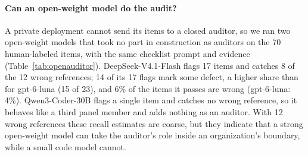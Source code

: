 \begin{table}[H]
\centering
\footnotesize
\setlength{\tabcolsep}{2.5pt}
\caption{The seven sampled references judged wrong on a clear question, the fix applied to each, whether the corrected query returns different rows on the current graph, and how many of the 11 models are scored right against the released and the corrected reference (zero-shot, projected EX).}
\label{tab:corrected}
\end{table}

\paragraph{Can an open-weight model do the audit?} A private deployment cannot send its items to a closed auditor, so we ran two open-weight models that took no part in construction as auditors on the 70 human-labeled items, with the same checklist prompt and evidence (Table~\ref{tab:openauditor}). DeepSeek-V4.1-Flash flags 17 items and catches 8 of the 12 wrong references; 14 of its 17 flags mark some defect, a higher share than for gpt-6-luna (15 of 23), and 6\% of the items it passes are wrong (gpt-6-luna: 4\%). Qwen3-Coder-30B flags a single item and catches no wrong reference, so it behaves like a third panel member and adds nothing as an auditor. With 12 wrong references these recall estimates are coarse, but they indicate that a strong open-weight model can take the auditor's role inside an organization's boundary, while a small code model cannot.

